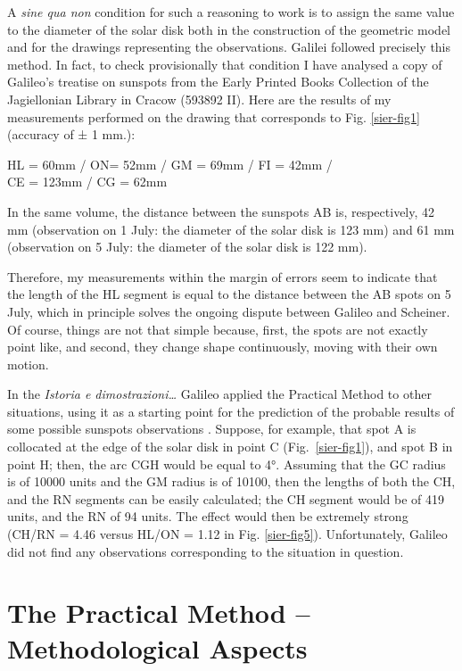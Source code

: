\begin{artengenv}
A \textit{sine qua non} condition for such a reasoning to work is to assign the same value to the diameter of the solar
disk both in the construction of the geometric model and for the drawings representing the observations. Galilei
followed precisely this method. In fact,
to check provisionally that condition
I have analysed a copy of Galileo’s treatise on sunspots from the Early
Printed Books Collection of the Jagiellonian Library in Cracow (593892 II). Here are the results of my measurements
performed on the drawing that corresponds to Fig. \ref{sier-fig1} (accuracy of ± 1 mm.):
\medskip

{\centering
HL = 60mm / ON= 52mm / GM = 69mm / FI = 42mm /\\CE = 123mm / CG = 62mm
\par}
\smallskip

In the same volume, the distance between the sunspots AB is, respectively, 42 mm (observation on 1 July: the diameter of
the solar disk is 123 mm) and 61 mm (observation on 5 July: the diameter of the solar disk is 122 mm).

Therefore, my measurements within the margin of errors seem to indicate that the length of the HL segment is equal to
the distance between the AB spots on 5 July, which in principle solves the ongoing dispute between Galileo and
Scheiner. Of course, things are not that simple because, first, the spots are not exactly point like, and second, they
change shape continuously, moving with their own motion.

In the \textit{Istoria e dimostrazioni\ldots} Galileo applied the Practical Method to other situations, using it as a
starting point for the prediction of the probable results of some possible sunspots observations
\parencite[see  V, 124.13-21;][p.116]{galilei_sunspots_2010}.
 Suppose, for example, that spot A is collocated
at the edge of the solar disk in point C (Fig.~\ref{sier-fig1}), and spot B in point H; then, the arc CGH would be equal to 4°.
Assuming that the GC radius is of 10000 units and the GM radius is of 10100, then the lengths of both the CH, and the
RN segments can be easily calculated; the CH segment would be of 419 units, and the RN of 94 units. The effect would
then be extremely strong (CH/RN = 4.46 versus HL/ON = 1.12 in Fig. \ref{sier-fig5}). Unfortunately, Galileo did not find any
observations corresponding to the situation in question.

\section{The Practical Method -- Methodological Aspects}


\end{artengenv}
